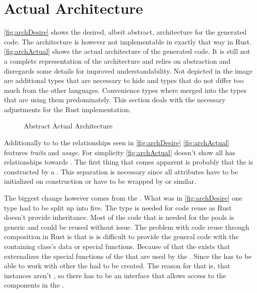 \documentclass[thesis]{subfiles}
\begin{document}
\section{Actual Architecture}
  \autoref{fig:archDesire} shows the desired, albeit abstract, architecture for the generated code.
  The architecture is however not implementable in exactly that way in Rust.
  \autoref{fig:archActual} shows the actual architecture of the generated code.
  It is still not a complete representation of the architecture and relies on abstraction and disregards some details for improved understandability.
  Not depicted in the image are additional types that are necessary to hide \traits and types that do not differ too much from the other languages.
  Convenience types where merged into the types that are using them predominately.
  This section deals with the necessary adjustments for the Rust implementation.

  \begin{figure}[ht]
    \centering
    
    \caption{Abstract Actual Architecture}\label{fig:archActual}
  \end{figure}

  Additionally to to the relationships seen in \autoref{fig:archDesire} \autoref{fig:archActual} features \emph{traits} and \emph{usage}.
  For simplicity \autoref{fig:archActual} doesn't show all has relationships towards \String.
  The first thing that comes apparent is probably that the \SkillFile is constructed by a \SkillFileBuilder.
  This separation is necessary since all attributes have to be initialized  on construction or have to be wrapped by \OptionT or similar.

  The biggest change however comes from the \UserTypePool.
  What was in \autoref{fig:archDesire} one type had to be split up into five.
  The \Pool type is needed for code reuse as Rust doesn't provide inheritance.
  Most of the code that is needed for the pools is generic and could be reused without issue.
  The problem with code reuse through composition in Rust is that is is difficult to provide the general code with the containing class's data or special functions.
  Because of that the \UserPartsMaker exists that externalizes the special functions of the \UserTypePool that are used by the \Pool.
  Since the \Pool has to be able to work with other \Pools the \PoolProxy had to be created.
  The reason for that is, that \UserTypePool instances aren't \Pools, so there has to be an interface that allows access to the \Pool components in the \UserTypePools.
\end{document}

